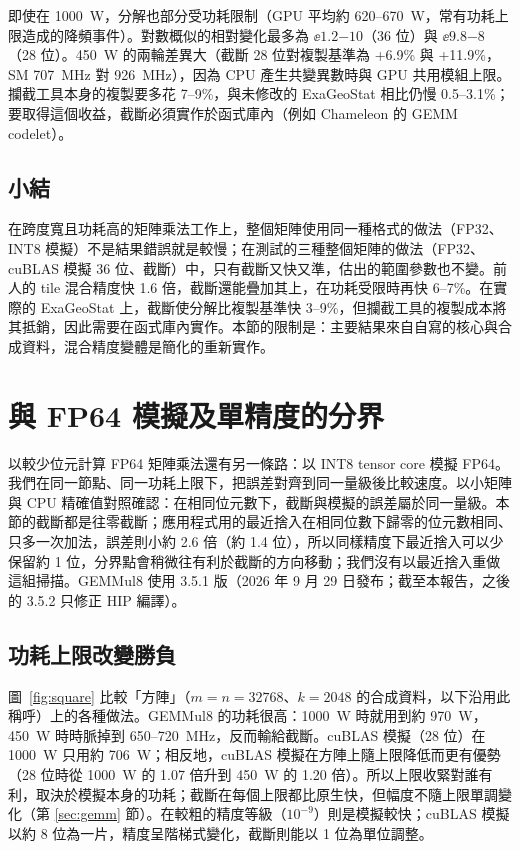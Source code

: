 即使在 1000~W，分解也部分受功耗限制（GPU 平均約 620–670~W，常有功耗上限造成的降頻事件）。對數概似的相對變化最多為 $\ee{1.2}{-10}$（36 位）與 $\ee{9.8}{-8}$（28 位）。450~W 的兩輪差異大（截斷 28 位對複製基準為 +6.9\% 與 +11.9\%，SM 707~MHz 對 926~MHz），因為 CPU 產生共變異數時與 GPU 共用模組上限。攔截工具本身的複製要多花 7–9\%，與未修改的 ExaGeoStat 相比仍慢 0.5–3.1\%；要取得這個收益，截斷必須實作於函式庫內（例如 Chameleon 的 GEMM codelet）。

\subsection{小結}

在跨度寬且功耗高的矩陣乘法工作上，整個矩陣使用同一種格式的做法（FP32、INT8 模擬）不是結果錯誤就是較慢；在測試的三種整個矩陣的做法（FP32、cuBLAS 模擬 36 位、截斷）中，只有截斷又快又準，估出的範圍參數也不變。前人的 tile 混合精度快 1.6 倍，截斷還能疊加其上，在功耗受限時再快 6–7\%。在實際的 ExaGeoStat 上，截斷使分解比複製基準快 3–9\%，但攔截工具的複製成本將其抵銷，因此需要在函式庫內實作。本節的限制是：主要結果來自自寫的核心與合成資料，混合精度變體是簡化的重新實作。

\section{與 FP64 模擬及單精度的分界}\label{sec:crossover}

以較少位元計算 FP64 矩陣乘法還有另一條路：以 INT8 tensor core 模擬 FP64。我們在同一節點、同一功耗上限下，把誤差對齊到同一量級後比較速度。以小矩陣與 CPU 精確值對照確認：在相同位元數下，截斷與模擬的誤差屬於同一量級。本節的截斷都是往零截斷；應用程式用的最近捨入在相同位數下歸零的位元數相同、只多一次加法，誤差則小約 2.6 倍（約 1.4 位），所以同樣精度下最近捨入可以少保留約 1 位，分界點會稍微往有利於截斷的方向移動；我們沒有以最近捨入重做這組掃描。GEMMul8 使用 3.5.1 版（2026 年 9 月 29 日發布；截至本報告，之後的 3.5.2 只修正 HIP 編譯）。

\subsection{功耗上限改變勝負}\label{sec:crossover-cap}

圖~\ref{fig:square} 比較「方陣」（$m = n = 32768$、$k = 2048$ 的合成資料，以下沿用此稱呼）上的各種做法。GEMMul8 的功耗很高：1000~W 時就用到約 970~W，450~W 時時脈掉到 650–720~MHz，反而輸給截斷。cuBLAS 模擬（28 位）在 1000~W 只用約 706~W；相反地，cuBLAS 模擬在方陣上隨上限降低而更有優勢（28 位時從 1000~W 的 1.07 倍升到 450~W 的 1.20 倍）。所以上限收緊對誰有利，取決於模擬本身的功耗；截斷在每個上限都比原生快，但幅度不隨上限單調變化（第 \ref{sec:gemm} 節）。在較粗的精度等級（$10^{-9}$）則是模擬較快；cuBLAS 模擬以約 8 位為一片，精度呈階梯式變化，截斷則能以 1 位為單位調整。

